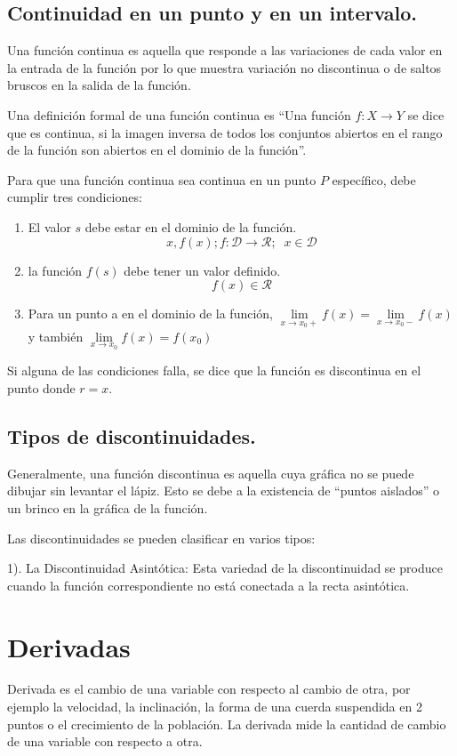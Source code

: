\documentclass[oneside,spanish,letterpaper]{extbook}
\theoremstyle{mythmstyle}
\begin{document}
\section{Continuidad en un punto y en un intervalo.}
Una función continua es aquella que responde a las variaciones de
cada valor en la entrada de la función por
lo que muestra variación no discontinua o de saltos bruscos en la salida de la función.

Una definición formal de una función continua es “Una función $f:X\rightarrow Y$ se dice que es continua,
si la imagen inversa de todos los conjuntos abiertos en el rango de la función son abiertos en el dominio de la función”.

Para que una función continua sea continua en un punto $P$ específico, debe cumplir tres condiciones:

\begin{enumerate}
 \item El valor $s$ debe estar en el dominio de la función.
  $$x, f(x);f:\mathscr{D}\rightarrow\mathscr{R};\;\; x\in \mathscr{D}$$
 \item la función $f(s)$ debe tener un valor definido.
 $$f(x)\in \mathscr{R}$$
 \item Para un punto a en el dominio de la función, 
$\underset{x\rightarrow x_0+}{\lim}f(x) = \underset{x\rightarrow x_0-}{\lim}f(x)$ y también
$\underset{x\rightarrow x_0}{\lim}f(x)=f(x_0)$
\end{enumerate}
Si alguna de las condiciones falla, se dice que la función es discontinua en el punto donde $r = x$. 

\section{Tipos de discontinuidades.}
Generalmente, una función discontinua es aquella cuya gráfica no se puede dibujar sin levantar
 el lápiz. Esto se debe a la existencia de “puntos aislados” o un brinco en la gráfica de la función.

Las discontinuidades se pueden clasificar en varios tipos:

1). La Discontinuidad Asintótica: Esta variedad de la discontinuidad se produce cuando la función
correspondiente no está conectada a la recta asintótica. 

\chapter{Derivadas}
Derivada es el cambio de una variable con respecto al cambio de otra, por ejemplo la velocidad, la inclinación, la forma
de una cuerda suspendida en 2 puntos o el crecimiento de la población. La derivada mide la cantidad de cambio de una variable 
con respecto a otra.
\end{document}
